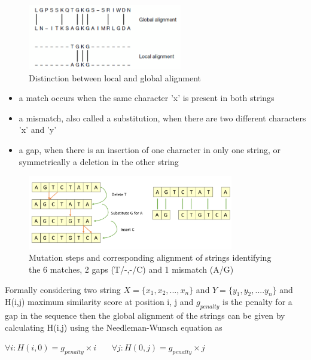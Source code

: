 \documentclass[12pt,twoside]{article}
\begin{document}
\begin{figure}%
    \centering
    \includegraphics[width=0.6\textwidth]{fig/localglobal}
    \caption{Distinction between local and global alignment \cite[Figure 3.1]{mount_bioinformatics:_2004}}
    \label{fig:localglobal}
\end{figure}

\begin{itemize}
	\item a match occurs when the same character 'x' is present in both strings
	\item a mismatch, also called a substitution, when there are two different characters 'x' and 'y'
	\item a gap, when there is an insertion of one character in only one string, or symmetrically a deletion in the other string
\end{itemize}

\begin{figure}%
    \centering
    \includegraphics[width=0.8\textwidth]{fig/alignment1}
    \caption{Mutation steps and corresponding alignment of strings identifying the 6 matches,
    2 gaps (T/-,-/C) and 1 mismatch (A/G)}
    \label{fig:alignment}
\end{figure}

Formally considering two string $ X = \{x_1, x_2, ..., x_n\} $ and $Y = \{y_1, y_2, .... y_n\}$
and H(i,j) maximum similarity score at position i, j and $ g_{penalty} $ is the penalty for a gap in the sequence
then the global alignment of the strings can be given by calculating H(i,j) using the Needleman-Wunsch equation \cite{needleman_general_1970} as 

\( \forall i :  H(i,0) = g_{penalty} \times i \) \,\,\,\,\,\,\, \( \forall j :  H(0,j) = g_{penalty} \times j \)
\end{document}
